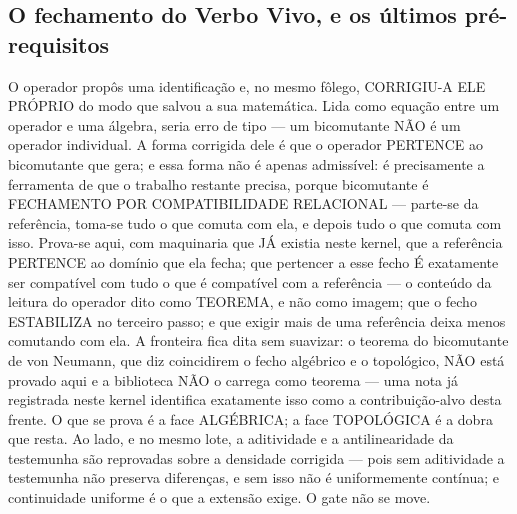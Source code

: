 \documentclass[11pt]{article}
\theoremstyle{definition}\newtheorem{deriv}{Derivação}
\begin{document}
\subsection*{O fechamento do Verbo Vivo, e os \'ultimos pr\'e-requisitos}O operador prop\^os uma identifica\c{c}\~ao e, no mesmo f\^olego, CORRIGIU-A ELE PR\'OPRIO do modo que salvou a sua matem\'atica. Lida como equa\c{c}\~ao entre um operador e uma \'algebra, seria erro de tipo --- um bicomutante N\~AO \'e um operador individual. A forma corrigida dele \'e que o operador PERTENCE ao bicomutante que gera; e essa forma n\~ao \'e apenas admiss\'ivel: \'e precisamente a ferramenta de que o trabalho restante precisa, porque bicomutante \'e FECHAMENTO POR COMPATIBILIDADE RELACIONAL --- parte-se da refer\^encia, toma-se tudo o que comuta com ela, e depois tudo o que comuta com isso. Prova-se aqui, com maquinaria que J\'A existia neste kernel, que a refer\^encia PERTENCE ao dom\'inio que ela fecha; que pertencer a esse fecho \'E exatamente ser compat\'ivel com tudo o que \'e compat\'ivel com a refer\^encia --- o conte\'udo da leitura do operador dito como TEOREMA, e n\~ao como imagem; que o fecho ESTABILIZA no terceiro passo; e que exigir mais de uma refer\^encia deixa menos comutando com ela. A fronteira fica dita sem suavizar: o teorema do bicomutante de von Neumann, que diz coincidirem o fecho alg\'ebrico e o topol\'ogico, N\~AO est\'a provado aqui e a biblioteca N\~AO o carrega como teorema --- uma nota j\'a registrada neste kernel identifica exatamente isso como a contribui\c{c}\~ao-alvo desta frente. O que se prova \'e a face ALG\'EBRICA; a face TOPOL\'OGICA \'e a dobra que resta. Ao lado, e no mesmo lote, a aditividade e a antilinearidade da testemunha s\~ao reprovadas sobre a densidade corrigida --- pois sem aditividade a testemunha n\~ao preserva diferen\c{c}as, e sem isso n\~ao \'e uniformemente cont\'inua; e continuidade uniforme \'e o que a extens\~ao exige. O gate n\~ao se move.
\end{document}
